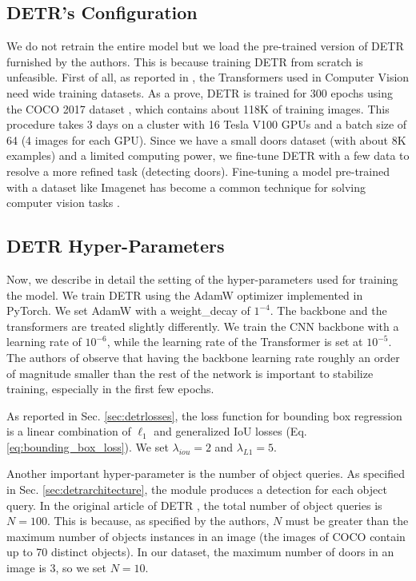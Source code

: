 \subsection{DETR's Configuration}
\label{sec:detr_configuration}
We do not retrain the entire model but we load the pre-trained version of DETR furnished by the authors. This is because training DETR from scratch is unfeasible. First of all, as reported in \cite{surveytransformer}, the Transformers used in Computer Vision need wide training datasets. As a prove, DETR is trained for 300 epochs using the COCO 2017 dataset \cite{coco}, which contains about 118K of training images. This procedure takes 3 days on a cluster with 16 Tesla V100 GPUs and a batch size of 64 (4 images for each GPU). Since we have a small doors dataset (with about 8K examples) and a limited computing power, we fine-tune DETR with a few data to resolve a more refined task (detecting doors). Fine-tuning a model pre-trained with a dataset like Imagenet \cite{imagenet} has become a common technique for solving computer vision tasks \cite{verydeepimagenet, resnet, fasterrcnn, yolo, yolov2}.

\subsection{DETR Hyper-Parameters}
Now, we describe in detail the setting of the hyper-parameters used for training the model. We train DETR using the AdamW  \cite{adamw} optimizer implemented in PyTorch. We set AdamW with a \textsf{weight\_decay} of $1^{-4}$. The backbone and the transformers are treated slightly differently.  We train the CNN backbone with a learning rate of $10^{-6}$, while the learning rate of the Transformer is set at $10^{-5}$. The authors of \cite{detr} observe that having the backbone learning rate roughly an order of magnitude smaller than the rest of the network is important to stabilize training, especially in the first few epochs. 

As reported in Sec. \ref{sec:detrlosses}, the loss function for bounding box regression is a linear combination of $\ell_1$ and generalized IoU \cite{generalizediou} losses (Eq. \ref{eq:bounding_box_loss}). We set $\lambda_{iou} = 2$ and $\lambda_{L1} = 5$.

Another important hyper-parameter is the number of object queries. As specified in Sec. \ref{sec:detrarchitecture}, the module produces a detection for each object query. In the original article of DETR \cite{detr}, the total number of object queries is  $N = 100$. This is because, as specified by the authors, $N$ must be greater than the maximum number of objects instances in an image (the images of COCO contain up to 70 distinct objects). In our dataset, the maximum number of doors in an image is 3, so we set $N = 10$.

